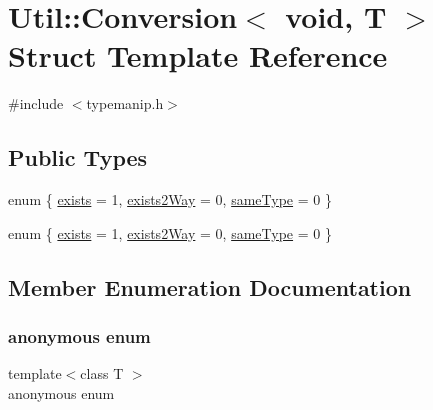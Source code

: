\hypertarget{structUtil_1_1Conversion_3_01void_00_01T_01_4}{}\section{Util\+:\+:Conversion$<$ void, T $>$ Struct Template Reference}
\label{structUtil_1_1Conversion_3_01void_00_01T_01_4}


{\ttfamily \#include $<$typemanip.\+h$>$}

\subsection*{Public Types}
\begin{DoxyCompactItemize}
\item 
enum \{ \mbox{\hyperlink{structUtil_1_1Conversion_3_01void_00_01T_01_4_a439b4697bb4532bfeeaae80846be79e9a129a8af4937637998530743e1f2d494c}{exists}} = 1, 
\mbox{\hyperlink{structUtil_1_1Conversion_3_01void_00_01T_01_4_a439b4697bb4532bfeeaae80846be79e9a6c0e14be9c85005e75e8983f85b9d839}{exists2\+Way}} = 0, 
\mbox{\hyperlink{structUtil_1_1Conversion_3_01void_00_01T_01_4_a439b4697bb4532bfeeaae80846be79e9aec8732fff4c17d98fbcf61563422dfd5}{same\+Type}} = 0
 \}
\item 
enum \{ \mbox{\hyperlink{structUtil_1_1Conversion_3_01void_00_01T_01_4_a439b4697bb4532bfeeaae80846be79e9a129a8af4937637998530743e1f2d494c}{exists}} = 1, 
\mbox{\hyperlink{structUtil_1_1Conversion_3_01void_00_01T_01_4_a439b4697bb4532bfeeaae80846be79e9a6c0e14be9c85005e75e8983f85b9d839}{exists2\+Way}} = 0, 
\mbox{\hyperlink{structUtil_1_1Conversion_3_01void_00_01T_01_4_a439b4697bb4532bfeeaae80846be79e9aec8732fff4c17d98fbcf61563422dfd5}{same\+Type}} = 0
 \}
\end{DoxyCompactItemize}


\subsection{Member Enumeration Documentation}
\mbox{\label{structUtil_1_1Conversion_3_01void_00_01T_01_4_a7a9a174b4d8737ddf017e4581cf64d6a}} 
\subsubsection{\texorpdfstring{anonymous enum}{anonymous enum}}
{\footnotesize\ttfamily template$<$class T $>$ \\
anonymous enum}

